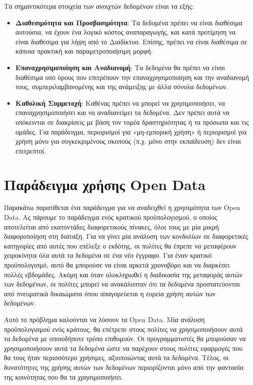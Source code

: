 \documentclass[oneside, 12pt]{book}
\begin{document}
Τα σημαντικότερα στοιχεία των ανοιχτών δεδομένων είναι τα εξής:
\begin{itemize}
    \item \textbf{Διαθεσιμότητα και Προσβασιμότητα}: Τα δεδομένα 
    πρέπει να είναι διαθέσιμα αυτούσια, να έχουν ένα λογικό κόστος 
    αναπαραγωγής, και κατά προτίμηση να είναι διαθέσιμα για λήψη από 
    το Διαδίκτυο. Επίσης, πρέπει να είναι διαθέσιμα σε κάποια πρακτική 
    και παραμετροποιήσιμη μορφή.
    \item \textbf{Επαναχρησιμοποίηση και Αναδιανομή}: Τα δεδομένα 
    θα πρέπει να είναι διαθέσιμα υπό όρους που επιτρέπουν την 
    επαναχρησιμοποίηση και την αναδιανομή τους, συμπεριλαμβανομένης 
    και της ανάμειξης με άλλα σύνολα δεδομένων.
    \item \textbf{Καθολική Συμμετοχή}: Καθένας πρέπει να μπορεί 
    να χρησιμοποιήσει, να επαναχρησιμοποιήσει και να αναδιανείμει τα
    δεδομένα. Δεν πρέπει αυτά να υπόκεινται σε διακρίσεις με βάση τον 
    τομέα δραστηριότητας ή τα πρόσωπα και τις ομάδες. Για παράδειγμα, 
    περιορισμοί για «μη-εμπορική χρήση» ή περιορισμοί για χρήση μόνο 
    για συγκεκριμένους σκοπούς (π.χ. μόνο στην εκπαίδευση) δεν είναι 
    επιτρεπτοί.
\end{itemize}
\cite{OpenData_definition}

\section{Παράδειγμα χρήσης Open Data}
Παρακάτω παρατίθεται ένα παράδειγμα για να αναδειχθεί η
χρησιμότητα των Open Data.
Ας πάρουμε το παράδειγμα ενός κρατικού προϋπολογισμού, ο οποίος 
αποτελείται από εκατοντάδες διαφορετικούς πίνακες, όλοι τους με μία 
μικρή διαφοροποίηση στη διάταξη.
Για να γίνει μία ανάλυση των κονδυλίων σε διαφορετικές κατηγορίες από 
αυτές που επέλεξε ο εκδότης, οι πολίτες θα έπρεπε να μεταφέρουν 
χειροκίνητα όλα αυτά τα δεδομένα σε ένα νέο έγγραφο. Για έναν κρατικό 
προϋπολογισμό, αυτό θα μπορούσε να είναι αρκετά χρονοβόρο και να διαρκέσει πολλές εβδομάδες.
Ακόμη και όταν ολοκληρωθεί η διαδικασία της μεταφοράς αυτών των 
δεδομένων, οι πολίτες μπορεί να ανακάλυπταν ότι τα δεδομένα 
προστατεύονται από πνευματικά δικαιώματα όπου απαγορεύεται η ευρεία 
χρήση αυτών των δεδομένων.

Αυτό το πρόβλημα καλούνται να λύσουν τα Open Data.
Μία ανάλυση προϋπολογισμού ενός κράτους, θα επέτρεπε στους πολίτες να 
χρησιμοποιήσουν αυτά τα δεδομένα με οποιοδήποτε τρόπο επιθυμούν.
Οι προγραμματιστές θα μπορούσαν να χρησιμοποιήσουν αυτά τα δεδομένα 
ώστε να παρέχουν στους πολίτες εφαρμογές που θα τους ήταν περισσότερο 
χρήσιμες, αξιοποιώντας αυτά τα δεδομένα.
Τέλος, οι δυνατότητες της χρήσης αυτών των δεδομένων περιορίζονται 
μόνο από την φαντασία της κοινότητας που θα τα χρησιμοποιήσει.
\cite{davies2012might}
\end{document}
